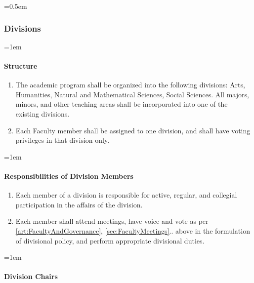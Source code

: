 \documentclass{manual}
\let\oldsubsubsection\subsubsection
\renewcommand\subsubsection{\leftskip=0.5em\oldsubsubsection}
\let\oldparagraph\paragraph
\renewcommand\paragraph{\leftskip=1em\oldparagraph}
\newcommand{\itemLevelA}{\alph*.}
\newcommand{\itemRefA}{\alph*}
\begin{document}
\subsubsection{Divisions}\label{sub:Divisions}

\paragraph{Structure}

	\begin{enumerate}[label=\itemLevelA,ref=\itemRefA]
	\item The academic program shall be organized into the following divisions: Arts, Humanities, Natural and Mathematical Sciences, Social Sciences. All majors, minors, and other teaching areas shall be incorporated into one of the existing divisions.
	\item Each Faculty member shall be assigned to one division, and shall have voting privileges in that division only.
	\end{enumerate}

\paragraph{Responsibilities of Division Members}

	\begin{enumerate}[label=\itemLevelA,ref=\itemRefA]
	\item Each member of a division is responsible for active, regular, and collegial participation in the affairs of the division.
	\item Each member shall attend meetings, have voice and vote as per \cref{art:FacultyAndGovernance}, \cref{sec:FacultyMeetings}.. above in the formulation of divisional policy, and perform appropriate divisional duties.
	\end{enumerate}

\paragraph{Division Chairs}\label{par:DivisionChairs}
\end{document}
